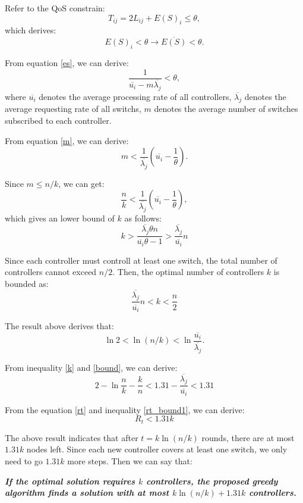Refer to the QoS constrain:
\begin{equation}
T_{ij}=2L_{ij}+E(S)_i\leq \theta,
\end{equation}
which derives:
\begin{equation}
E(S)_i < \theta \rightarrow \overline{E(S)} < \theta.
\end{equation}

From equation \ref{es}, we can derive:
\begin{equation}
\label{m}
\frac{1}{\overline{u_i}-m\overline{\lambda_j}} < \theta,
\end{equation}
where $\overline{u_i}$ denotes the average processing rate of all controllers, $\overline{\lambda_j}$ denotes the average requesting rate of all switchs, $m$ denotes the average number of switches subscribed to each controller.

From equation \ref{m}, we can derive:
\begin{equation}
m < \frac{1}{\overline{\lambda_j}}(\overline{u_i}-\frac{1}{\theta}).
\end{equation}

Since $m\leq n/k$, we can get:
\begin{equation}
\frac{n}{k} < \frac{1}{\overline{\lambda_j}}(\overline{u_i}-\frac{1}{\theta}),
\end{equation}
which gives an lower bound of $k$ as follows:
\begin{equation}
k>\frac{\overline{\lambda_j}\theta n}{\overline{u_i}\theta-1}>\frac{\overline{\lambda_j}}{\overline{u_i}}n
\end{equation}

Since each controller must controll at least one switch, the total number of controllers cannot exceed $n/2$. Then, the optimal number of controllers $k$ is bounded as:
\begin{equation}
\label{k}
\frac{\overline{\lambda_j}}{\overline{u_i}}n<k<\frac{n}{2}
\end{equation}

The result above derives that:
\begin{equation}
\label{bound}
\ln 2<\ln(n/k)<\ln \frac{\overline{u_i}}{\overline{\lambda_j}}.
\end{equation}

From inequality \ref{k} and \ref{bound}, we can derive:
\begin{equation}
\label{rt_bound1}
2-\ln \frac{n}{k}- \frac{k}{n}<1.31-\frac{\overline{\lambda_j}}{\overline{u_i}}<1.31
\end{equation}

From the equation \ref{rt} and inequality \ref{rt_bound1}, we can derive:
\begin{equation}
R_t<1.31k
\end{equation}

The above result indicates that after $t=k\ln(n/k)$ rounds, there are at most $1.31k$ nodes left. Since each new controller covers at least one switch, we only need to go $1.31k$ more steps. Then we can say that:

\emph{\textbf{If the optimal solution requires $k$ controllers, the proposed greedy algorithm finds a solution with at most $k\ln(n/k)+1.31k$ controllers.}}
